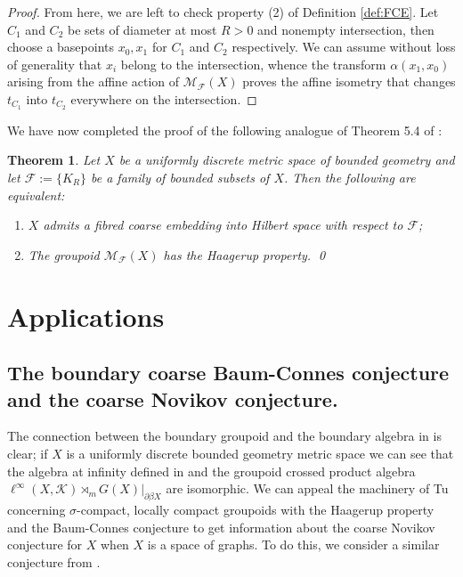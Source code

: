 \documentclass[11pt]{amsart}
\theoremstyle{plain}
\newtheorem{theorem}{Theorem}%
\theoremstyle{definition}%
\theoremstyle{remark}%
\begin{document}
{\begin{proof}
From here, we are left to check property (2) of Definition \ref{def:FCE}. Let $C_{1}$ and $C_{2}$ be sets of diameter at most $R>0$ and nonempty intersection, then choose a basepoints $x_{0}, x_{1}$ for $C_{1}$ and $C_{2}$ respectively. We can assume without loss of generality that $x_{i}$ belong to the intersection, whence the transform $\alpha(x_{1},x_{0})$ arising from the affine action of $\mathcal{M}_{\mathcal{F}}(X)$ proves the affine isometry that changes $t_{C_{1}}$ into $t_{C_{2}}$ everywhere on the intersection. 
\end{proof}

We have now completed the proof of the following analogue of Theorem 5.4 of \cite{MR1905840}:

\begin{theorem}
Let $X$ be a uniformly discrete metric space of bounded geometry and let $\mathcal{F}:=\lbrace K_{R} \rbrace$ be a family of bounded subsets of $X$. Then the following are equivalent:
\begin{enumerate}
\item $X$ admits a fibred coarse embedding into Hilbert space with respect to $\mathcal{F}$;
\item The groupoid $\mathcal{M}_{\mathcal{F}}(X)$ has the Haagerup property. \qed
\end{enumerate}
\end{theorem}

\section{Applications}\label{sect:apps}

\subsection{The boundary coarse Baum-Connes conjecture and the coarse Novikov conjecture.}\label{Sect:apps}
The connection between the boundary groupoid and the boundary algebra in \cite{FCEpaper} is clear; if $X$ is a uniformly discrete bounded geometry metric space we can see that the algebra at infinity defined in \cite{FCEpaper} and the groupoid crossed product algebra $\ell^{\infty}(X,\mathcal{K})\rtimes_{m}G(X)|_{\partial\beta X}$ are isomorphic. We can appeal the machinery of Tu \cite{MR1703305} concerning $\sigma$-compact, locally compact groupoids with the Haagerup property and the Baum-Connes conjecture to get information about the coarse Novikov conjecture for $X$ when $X$ is a space of graphs. To do this, we consider a similar conjecture from \cite{mypub1}.

}
\end{document}
